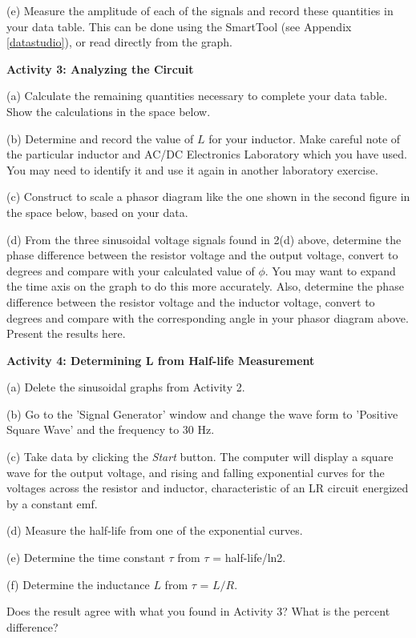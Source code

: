 (e) Measure the amplitude of each of the signals and record these
quantities in your data table. This can be done using the SmartTool 
(see Appendix \ref{datastudio}), or read directly from the graph.

\textbf{Activity 3: Analyzing the Circuit}
 
(a) Calculate the remaining quantities necessary to complete your
data table. Show the calculations in the space below.
\vspace{3in}

(b) Determine and record the  value of $L$  for your inductor.
Make careful note of
the particular inductor and AC/DC Electronics Laboratory
which you have used. You may need to identify
it and use it again in another laboratory exercise.
\vspace{1.5in}

\newpage

(c) Construct to scale a phasor diagram like the one shown in the
second figure in the space below, based on your data.
\vspace{2in}


(d) From the three sinusoidal voltage signals found in 2(d) above, determine the phase difference between the resistor voltage and the output voltage, convert to degrees and compare with your calculated value of \( \phi  \). You may want to expand the time axis on the graph to do this more accurately. Also, determine the phase difference between the resistor voltage and the inductor voltage, convert to degrees and compare with the corresponding angle in your phasor diagram above. Present the results here.
\vspace{1.2in}

\textbf{Activity 4: Determining L from Half-life Measurement}

(a) Delete the sinusoidal graphs from Activity 2.

(b) Go to the 'Signal Generator' window and change the wave form to 'Positive Square Wave' and the frequency to 30 Hz. 

(c) Take data by clicking the \emph{Start} button. The computer will display a square wave for the output voltage, and rising and falling exponential curves for the voltages across the resistor and inductor, characteristic of an LR circuit energized by a constant emf.

(d) Measure the half-life from one of the exponential curves.
\vspace{10mm}

(e) Determine the time constant \( \tau  \) from \( \tau  \) = half-life/ln2.
\vspace{10mm}

(f) Determine the inductance $L$ from \( \tau  \) = $L/R$.
\vspace{15mm}

Does the result agree with what you found in Activity 3? What is the percent difference?




